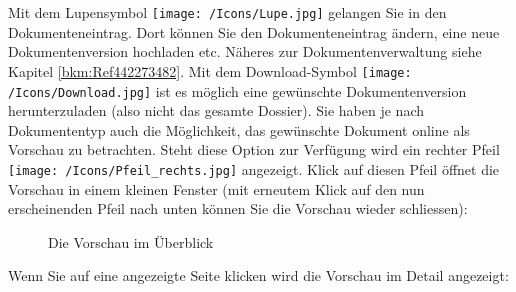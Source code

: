 Mit dem Lupensymbol \texttt{[image: /Icons/Lupe.jpg]}  gelangen Sie in den Dokumenteneintrag. Dort können Sie den Dokumenteneintrag ändern, eine neue Dokumentenversion hochladen etc. Näheres zur Dokumentenverwaltung siehe Kapitel \ref{bkm:Ref442273482}. Mit dem Download-Symbol \texttt{[image: /Icons/Download.jpg]}  ist es möglich eine gewünschte Dokumentenversion herunterzuladen (also nicht das gesamte Dossier). Sie haben je nach Dokumententyp auch die Möglichkeit, das gewünschte Dokument online als Vorschau zu betrachten. Steht diese Option zur Verfügung wird ein rechter Pfeil \texttt{[image: /Icons/Pfeil\_rechts.jpg]}  angezeigt. Klick auf diesen Pfeil öffnet die Vorschau in einem kleinen Fenster (mit erneutem Klick auf den nun erscheinenden Pfeil nach unten können Sie die Vorschau wieder schliessen):

\begin{figure}[H]
\caption{Die Vorschau im Überblick}
\end{figure}

\pagebreak

Wenn Sie auf eine angezeigte Seite klicken wird die Vorschau im Detail angezeigt:

\vspace{\baselineskip}

